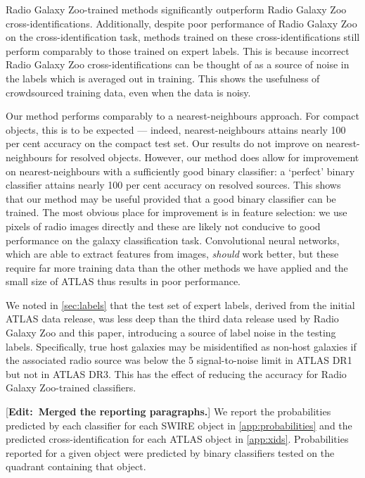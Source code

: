 \documentclass[fleqn,usenatbib,usedcolumn]{mnras}
\newcommand{\edit}[1]{ {\color{red}[{\bf Edit:~{#1}}]} }
\begin{document}
    Radio Galaxy Zoo-trained methods significantly outperform Radio Galaxy Zoo cross-identifications. Additionally, despite poor performance of Radio Galaxy Zoo on the cross-identification task, methods trained on these cross-identifications still perform comparably to those trained on expert labels. This is because incorrect Radio Galaxy Zoo cross-identifications can be thought of as a source of noise in the labels which is averaged out in training. This shows the usefulness of crowdsourced training data, even when the data is noisy.

    Our method performs comparably to a nearest-neighbours approach. For compact objects, this is to be expected --- indeed, nearest-neighbours attains nearly 100 per cent accuracy on the compact test set. Our results do not improve on nearest-neighbours for resolved objects. However, our method does allow for improvement on nearest-neighbours with a sufficiently good binary classifier: a `perfect' binary classifier attains nearly 100 per cent accuracy on resolved sources. This shows that our method may be useful provided that a good binary classifier can be trained. The most obvious place for improvement is in feature selection: we use pixels of radio images directly and these are likely not conducive to good performance on the galaxy classification task. Convolutional neural networks, which are able to extract features from images, \emph{should} work better, but these require far more training data than the other methods we have applied and the small size of ATLAS thus results in poor performance.

    We noted in \autoref{sec:labels} that the test set of expert labels, derived from the initial ATLAS data release, was less deep than the third data release used by Radio Galaxy Zoo and this paper, introducing a source of label noise in the testing labels. Specifically, true host galaxies may be misidentified as non-host galaxies if the associated radio source was below the 5 signal-to-noise limit in ATLAS DR1 but not in ATLAS DR3. This has the effect of reducing the accuracy for Radio Galaxy Zoo-trained classifiers.

    \edit{Merged the reporting paragraphs.} We report the probabilities predicted by each classifier for each SWIRE object in \autoref{app:probabilities} and the predicted cross-identification for each ATLAS object in \autoref{app:xids}. Probabilities reported for a given object were predicted by binary classifiers tested on the quadrant containing that object.
\end{document}

